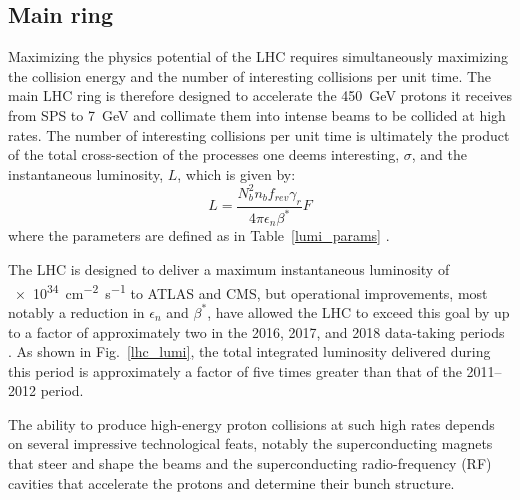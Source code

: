 

\subsection{Main ring}
Maximizing the physics potential of the LHC requires simultaneously maximizing the collision energy and the number of interesting collisions per unit time. The main LHC ring is therefore designed to accelerate the \SI{450}{\GeV} protons it receives from SPS to \SI{7}{\GeV} and collimate them into intense beams to be collided at high rates. The number of interesting collisions per unit time is ultimately the product of the total cross-section of the processes one deems interesting, $\sigma$, and the instantaneous luminosity, $L$, which is given by:
\begin{equation}
\label{lumi_eq}
L = \frac{N_{b}^{2} n_{b} f_{rev} \gamma_{r}}{4 \pi \epsilon_{n} \beta^{*}}F
\end{equation}
where the parameters are defined as in Table~\ref{lumi_params}  \cite{lhc_machine}.



The LHC is designed to deliver a maximum instantaneous luminosity of \linebreak[4] \SI{e34}{\cm\tothe{-2}\s\tothe{-1}} to ATLAS and CMS, but operational improvements, most notably a reduction in $\epsilon_{n}$ and $\beta^{*}$, have allowed the LHC to exceed this goal by up to a factor of approximately two in the 2016, 2017, and 2018 data-taking periods \cite{lhc_run2_operation}. As shown in Fig.~\ref{lhc_lumi}, the total integrated luminosity delivered during this period is approximately a factor of five times greater than that of the 2011--2012 period.

The ability to produce high-energy proton collisions at such high rates depends on several impressive technological feats, notably the superconducting magnets that steer and shape the beams and the superconducting radio-frequency (RF) cavities that accelerate the protons and determine their bunch structure.



